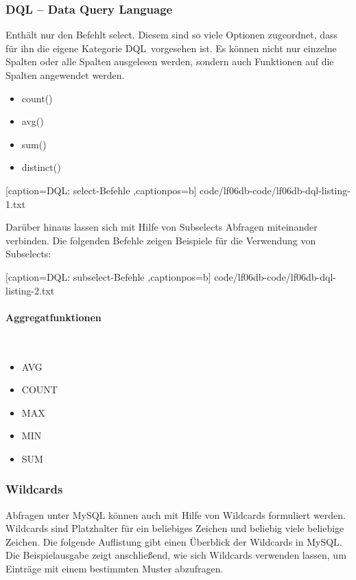 \subsubsection{DQL -- Data Query Language}
Enthält nur den Befehlt \ql select\qr. Diesem sind so viele Optionen zugeordnet, dass für ihn die eigene Kategorie \ql DQL\qr\ vorgesehen ist. Es können nicht nur einzelne Spalten oder alle Spalten ausgelesen werden, sondern auch Funktionen auf die Spalten angewendet werden.

\begin{itemize}
	\item count()
	\item avg()
	\item sum()
	\item distinct()
\end{itemize}


	[caption={DQL: select-Befehle}
	\label{lst:dql-select},captionpos=b]
	{code/lf06db-code/lf06db-dql-listing-1.txt}

Darüber hinaus lassen sich mit Hilfe von Subselects Abfragen miteinander verbinden. Die folgenden Befehle zeigen Beispiele für die Verwendung von Subselects:


	[caption={DQL: subselect-Befehle}
	\label{lst:dql-subselect},captionpos=b]
	{code/lf06db-code/lf06db-dql-listing-2.txt}
	
\paragraph{Aggregatfunktionen}~\\
\begin{itemize}
	\item AVG
	\item COUNT
	\item MAX
	\item MIN
	\item SUM
\end{itemize}

\subsubsection{Wildcards}

Abfragen unter MySQL können auch mit Hilfe von Wildcards formuliert werden. Wildcards sind Platzhalter für ein beliebiges Zeichen und beliebig viele beliebige Zeichen. Die folgende Auflistung gibt einen Überblick der Wildcards in MySQL. Die Beispielausgabe zeigt anschließend, wie sich Wildcards verwenden lassen, um Einträge mit einem bestimmten Muster abzufragen.

